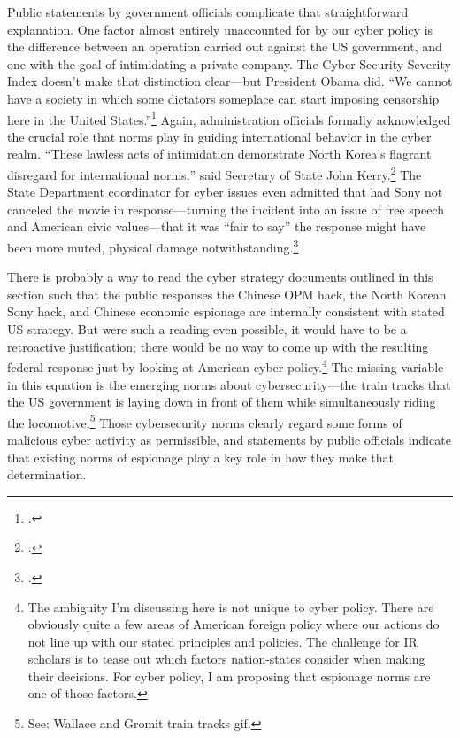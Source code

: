 \documentclass{report}
\begin{document}
\begin{refsegment}
Public statements by government officials complicate that straightforward explanation. One factor almost entirely unaccounted for by our cyber policy is the difference between an operation carried out against the US government, and one with the goal of intimidating a private company. The Cyber Security Severity Index doesn't make that distinction clear---but President Obama did. ``We cannot have a society in which some dictators someplace can start imposing censorship here in the United States.''\footcite{perez_obama_2014} Again, administration officials formally acknowledged the crucial role that norms play in guiding international behavior in the cyber realm. ``These lawless acts of intimidation demonstrate North Korea's flagrant disregard for international norms,'' said Secretary of State John Kerry.\footcite{perez_obama_2014} The State Department coordinator for cyber issues even admitted that had Sony not canceled the movie in response---turning the incident into an issue of free speech and American civic values---that it was ``fair to say'' the response might have been more muted, physical damage notwithstanding.\footcite{nakashima_why_2015}

There is probably a way to read the cyber strategy documents outlined in this section such that the public responses the Chinese OPM hack, the North Korean Sony hack, and Chinese economic espionage are internally consistent with stated US strategy. But were such a reading even possible, it would have to be a retroactive justification; there would be no way to come up with the resulting federal response just by looking at American cyber policy.\footnote{The ambiguity I'm discussing here is not unique to cyber policy. There are obviously quite a few areas of American foreign policy where our actions do not line up with our stated principles and policies. The challenge for IR scholars is to tease out which factors nation-states consider when making their decisions. For cyber policy, I am proposing that espionage norms are one of those factors.} The missing variable in this equation is the emerging norms about cybersecurity---the train tracks that the US government is laying down in front of them while simultaneously riding the locomotive.\footnote{See: Wallace and Gromit train tracks gif.} Those cybersecurity norms clearly regard some forms of malicious cyber activity as permissible, and statements by public officials indicate that existing norms of espionage play a key role in how they make that determination.


\end{refsegment}
\end{document}

